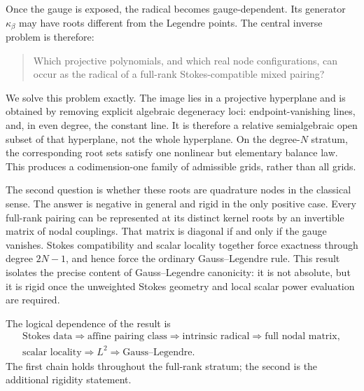 \documentclass[11pt,a4paper]{article}
\theoremstyle{definition}
\theoremstyle{remark}
\begin{document}
Once the gauge is exposed, the radical becomes gauge-dependent.  Its generator
$\kappa_\beta$ may have roots different from the Legendre points.  The central inverse
problem is therefore:
\begin{quote}
Which projective polynomials, and which real node configurations, can occur as the radical
of a full-rank Stokes-compatible mixed pairing?
\end{quote}
We solve this problem exactly.  The image lies in a projective hyperplane and is obtained by
removing explicit algebraic degeneracy loci: endpoint-vanishing lines, and, in even degree,
the constant line.  It is therefore a relative semialgebraic open subset of that hyperplane,
not the whole hyperplane.  On the degree-$N$ stratum, the corresponding root sets satisfy one
nonlinear but elementary balance law.  This produces a codimension-one family of admissible
grids, rather than all grids.

The second question is whether these roots are quadrature nodes in the classical sense.  The
answer is negative in general and rigid in the only positive case.  Every full-rank pairing
can be represented at its distinct kernel roots by an invertible matrix of nodal couplings.
That matrix is diagonal if and only if the gauge vanishes.  Stokes compatibility and scalar
locality together force exactness through degree $2N-1$, and hence force the ordinary
Gauss--Legendre rule.  This result isolates the precise content of Gauss--Legendre
canonicity: it is not absolute, but it is rigid once the unweighted Stokes geometry and local
scalar power evaluation are required.

The logical dependence of the result is
\begin{equation}\label{eq:logicaldiagram}
 \begin{gathered}
 \boxed{\text{Stokes data}}\Longrightarrow
 \boxed{\text{affine pairing class}}\Longrightarrow
 \boxed{\text{intrinsic radical}}\Longrightarrow
 \boxed{\text{full nodal matrix}},\\[1mm]
 \boxed{\text{scalar locality}}\Longrightarrow
 \boxed{L^2}\Longrightarrow
 \boxed{\text{Gauss--Legendre}}.
 \end{gathered}
\end{equation}
The first chain holds throughout the full-rank stratum; the second is the additional rigidity
statement.
\end{document}
